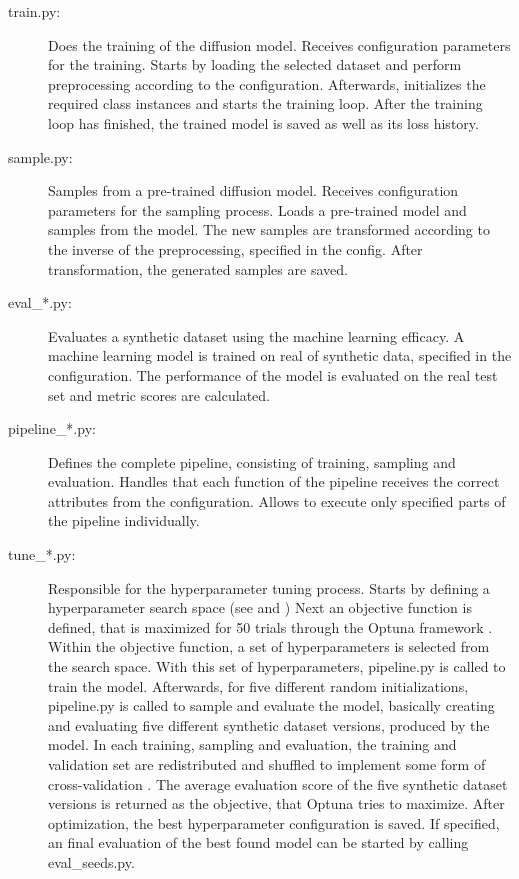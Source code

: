 \begin{description}
    \item[train.py:]
    Does the training of the diffusion model.
    Receives configuration parameters for the training.
    Starts by loading the selected dataset and perform preprocessing according to the configuration.
    Afterwards, initializes the required class instances and starts the training loop.
    After the training loop has finished, the trained model is saved as well as its loss history.

    \item[sample.py:]
    Samples from a pre-trained diffusion model.
    Receives configuration parameters for the sampling process.
    Loads a pre-trained model and samples from the model.
    The new samples are transformed according to the inverse of the preprocessing, specified in the config.
    After transformation, the generated samples are saved.

    \item[eval\_*.py:]
    Evaluates a synthetic dataset using the machine learning efficacy.
    A machine learning model is trained on real of synthetic data, specified in the configuration.
    The performance of the model is evaluated on the real test set and metric scores are calculated.

    \item[pipeline\_*.py:]
    Defines the complete pipeline, consisting of training, sampling and evaluation.
    Handles that each function of the pipeline receives the correct attributes from the configuration.
    Allows to execute only specified parts of the pipeline individually.

    \item[tune\_*.py:]
    Responsible for the hyperparameter tuning process.
    Starts by defining a hyperparameter search space (see \cite[Table 1, p. 4]{kotelnikov2022TabDDPMModellingTabular} and \cite[Table 7-11, p. 13 f.]{kotelnikov2022TabDDPMModellingTabular})
    Next an objective function is defined, that is maximized for 50 trials through the Optuna framework \cite{optuna_2019}.
    Within the objective function, a set of hyperparameters is selected from the search space.
    With this set of hyperparameters, pipeline.py is called to train the model.
    Afterwards, for five different random initializations, pipeline.py is called to sample and evaluate the model, basically creating and evaluating five different synthetic dataset versions, produced by the model.
    In each training, sampling and evaluation, the training and validation set are redistributed and shuffled to implement some form of cross-validation \cite{kohavi2001StudyCrossValidationBootstrap}.
    The average evaluation score of the five synthetic dataset versions is returned as the objective, that Optuna tries to maximize.
    After optimization, the best hyperparameter configuration is saved.
    If specified, an final evaluation of the best found model can be started by calling eval\_seeds.py.


\end{description}
